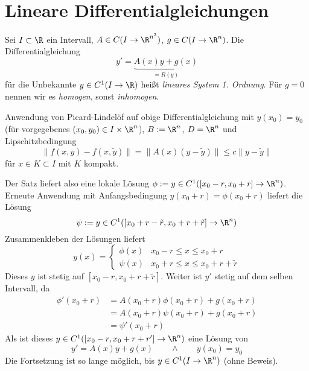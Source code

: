 %

\section{Lineare Differentialgleichungen}

\begin{df} \label{4.1}
	Sei $I \subset \R$ ein Intervall, $A \in C(I \to \R^{n^2})$, $g \in C(I \to \R^n)$.
	Die Differentialgleichung
	\[
		y' = \underbrace{A(x)y + g(x)}_{=R(y)}
	\]
	für die Unbekannte $y \in C^1(I \to \R)$ heißt \emph{lineares System 1. Ordnung}.
	Für $g = 0$ nennen wir es \emph{homogen}, sonst \emph{inhomogen}.
\end{df}

\begin{nt} \label{4.2}
	Anwendung von Picard-Lindelöf auf obige Differentialgleichung mit $y(x_0) = y_0$ (für vorgegebenes $(x_0,y_0) \in I \times \R^n$), $B := \R^n$, $D = \R^n$ und Lipschitzbedingung
	\[
		\|f(x,y) - f(x,\tilde y) \| = \| A(x) (y-\tilde y) \| \le c \|y - \tilde y\|
	\]
	für $x \in K \subset I$ mit $K$ kompakt.

	Der Satz liefert also eine lokale Lösung $\phi := y \in C^1([x_0 - r, x_0 + r] \to \R^n)$.
	Erneute Anwendung mit Anfangsbedingung $y(x_0 + r) = \phi(x_0 + r)$ liefert die Lösung
	\[
		\psi := y \in C^1([x_0 + r - \tilde r, x_0 + r + \tilde r] \to \R^n)
	\]
	Zusammenkleben der Lösungen liefert
	\[
		y(x) = \begin{cases}
			\phi(x) & x_0-r \le x \le x_0 + r \\
			\psi(x) & x_0+r \le x \le x_0 + r + \tilde r
		\end{cases}
	\]
	Dieses $y$ ist stetig auf $[x_0-r, x_0 + r + \tilde r]$.
	Weiter ist $y'$ stetig auf dem selben Intervall, da
	\begin{align*}
		\phi'(x_0 + r) &= A(x_0 + r) \phi(x_0 + r) + g(x_0 + r) \\
		&= A(x_0+r) \psi(x_0+r) + g(x_0 +r) \\
		&= \psi'(x_0 +r)
	\end{align*}
	Als ist dieses $y \in C^1([x_0-r, x_0+r+r'] \to \R^n)$ eine Lösung von
	\[
		y' = A(x)y + g(x)
		\qquad \land \qquad
		y(x_0) = y_0
	\]
	Die Fortsetzung ist so lange möglich, bis $y \in C^1(I \to \R^n)$ (ohne Beweis).
\end{nt}

